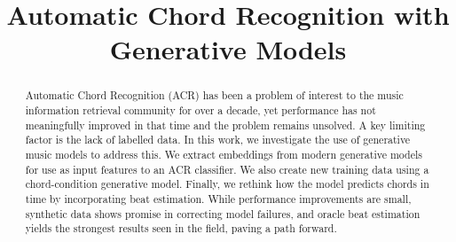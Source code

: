 \documentclass{article}
\title{Automatic Chord Recognition with Generative Models}
\begin{document}
\maketitle

\begin{abstract}
Automatic Chord Recognition (ACR) has been a problem 
of interest to the music information retrieval community 
for over a decade, yet performance has not meaningfully 
improved in that time and the problem remains unsolved. 
A key limiting factor is the lack of labelled data. In 
this work, we investigate the use of generative music 
models to address this. We extract embeddings from modern generative models for use as input features to an ACR classifier. We also create new training data using a chord-condition generative model. Finally, we rethink how the model predicts 
chords in time by incorporating beat estimation. While performance improvements are small, synthetic data shows 
promise in correcting model failures, and oracle beat estimation yields the strongest 
results seen in the field, paving a path forward.
\end{abstract}











\end{document}
